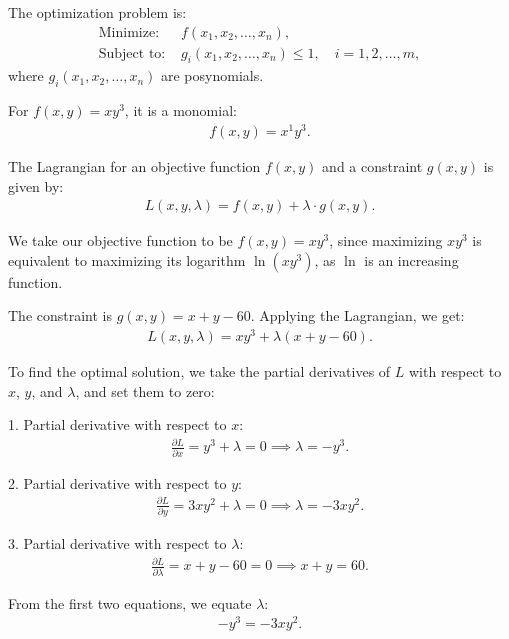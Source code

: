\documentclass[journal,12pt,onecolumn]{IEEEtran}
\theoremstyle{remark}
\begin{document}
The optimization problem is:
\begin{align}
    \text{Minimize: } & f(x_1, x_2, \dots, x_n), \\
    \text{Subject to: } & g_i(x_1, x_2, \dots, x_n) \leq 1, \quad i = 1, 2, \dots, m,
\end{align}
where $g_i(x_1, x_2, \dots, x_n)$ are posynomials.

For $f(x, y) = xy^3$, it is a monomial:
\begin{align}
    f(x, y) = x^1 y^3.
\end{align}

The Lagrangian for an objective function $f(x, y)$ and a constraint $g(x, y)$ is given by:
\begin{align}
    L(x, y, \lambda) = f(x, y) + \lambda \cdot g(x, y).
\end{align}

We take our objective function to be $f(x, y) = x y^3$, since maximizing $x y^3$ is equivalent to maximizing its logarithm $\ln(x y^3)$, as $\ln$ is an increasing function.

The constraint is $g(x, y) = x + y - 60$. Applying the Lagrangian, we get:
\begin{align}
    L(x, y, \lambda) = x y^3 + \lambda (x + y - 60).
\end{align}

To find the optimal solution, we take the partial derivatives of $L$ with respect to $x$, $y$, and $\lambda$, and set them to zero:

1. Partial derivative with respect to $x$:
\begin{align}
    \frac{\partial L}{\partial x} = y^3 + \lambda = 0 \implies \lambda = -y^3.
\end{align}

2. Partial derivative with respect to $y$:
\begin{align}
    \frac{\partial L}{\partial y} = 3x y^2 + \lambda = 0 \implies \lambda = - 3x y^2.
\end{align}

3. Partial derivative with respect to $\lambda$:
\begin{align}
    \frac{\partial L}{\partial \lambda} = x + y - 60 = 0 \implies x + y = 60.
\end{align}

From the first two equations, we equate $\lambda$:
\begin{align}
    -y^3 = -3x y^2.
\end{align}
\end{document}

